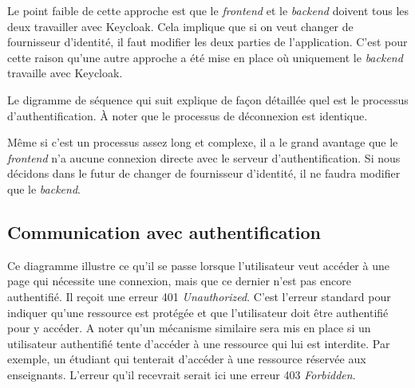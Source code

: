 Le point faible de cette approche est que le \emph{frontend} et le \emph{backend} doivent tous les deux travailler avec Keycloak. Cela implique que si on veut changer de fournisseur d'identité, il faut modifier les deux parties de l'application.
C'est pour cette raison qu'une autre approche a été mise en place où uniquement le \emph{backend} travaille avec Keycloak.

Le digramme de séquence qui suit explique de façon détaillée quel est le processus d'authentification. À noter que le processus de déconnexion est identique.

Même si c'est un processus assez long et complexe, il a le grand avantage que le \emph{frontend} n'a aucune connexion directe avec le serveur d'authentification. Si nous décidons dans le futur de changer de fournisseur d'identité, il ne faudra modifier que le \emph{backend}.

\subsection{Communication avec authentification}


Ce diagramme illustre ce qu'il se passe lorsque l'utilisateur veut accéder à une page qui nécessite une connexion, mais que ce dernier n'est pas encore authentifié. Il reçoit une erreur 401 \emph{Unauthorized}. C'est l'erreur standard pour indiquer qu'une ressource est protégée et que l'utilisateur doit être authentifié pour y accéder. A noter qu'un mécanisme similaire sera mis en place si un utilisateur authentifié tente d'accéder à une ressource qui lui est interdite. Par exemple, un étudiant qui tenterait d'accéder à une ressource réservée aux enseignants. L'erreur qu'il recevrait serait ici une erreur 403 \emph{Forbidden}.